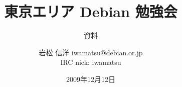 




\documentclass[cjk,dvipdfmx,12pt]{beamer}
\usepackage{monthlypresentation}


\title{東京エリア Debian 勉強会}
\subtitle{資料}
\author{岩松 信洋 iwamatsu@debian.or.jp\\IRC nick: iwamatsu}
\date{2009年12月12日}



